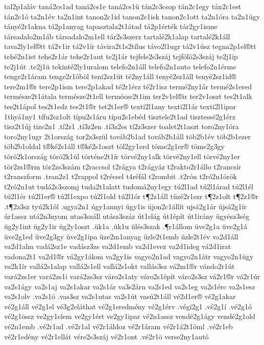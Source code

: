 {tal2p1aláv
taná2cs1ad
taná2cs1e
taná2cs1ü
tán2c3csop
tán2c1egy
tán2c1est
tán2c1ó
ta2n1év
ta2n1int
tanon2c1id
tanon2c1isk
tanon2c1ott
ta2n1óra
ta2n1ügy
tányé2r1akna
tá2p1anyag
tapasztala2t1átad
tá2p1érték
tár2gy1isme
társadalo2m1áb
társadalo2m1ell
tár2s3szerz %
tartalé2k1alap
tartalé2k1áll
tava2ly1el®tt
tá2v1ir
tá2v1ír
távira2t1s2tílus
távo2l1ugr
tá2v1úsz
tegna2p1el®tt
tehé2n1ist
tehe2r1ár
tehe2r1aut
te2j1ár
tejfele2s3száj %
tejfölö2s3száj %
te2j1ip
te2j1út
.te2j1ü
tekinté2ly1uralom
telefo2n1áll
telefo2n1auto
telefo2n1érme
tenge2r1áram
tenge2r1öböl
teni2sz1üt
té2ny1áll
tenyé2sz1áll
tenyé2sz1id®
tere2m1®r
tere2p1ism
tere2p1akad
té2r1érz
té2r1isz
termé2ny1ár
termé2s1ered
természe2t1átala
természe2t1ell
természe2t1im
ter2v1el®ir
ter2v1oszt
tes2t1alk
tes2t1ápol
tes2t1edz
tes2t1®r
tet2t1er®
texti2l1any
texti2l1ár
texti2l1ipar
1thyá1ny1 %
tífu2sz1olt
típu2s1áru
típu2s1ebéd
tisztele2t1ad
tisztessé2g1érz
tisz2t1új
tize2n1
.tí2z1
.tí3z2en
.tí3z2es
tí2z3szer
toalet2t1aszt
toro2ny1óra
toro2ny1ugr
2t1ország %
tor2z3szül
továb2b1ad
továb2b1áll
töb2b1év
töb2b1ezer
töb2b1oldal
t®ké2s1áll
t®ké2s1oszt
töl2gy1erd
töme2g1er®
töme2g3gy
törö2k1ország
törö2k1ül
történe2t1ír
törvé2ny1alk
törvé2ny1ell
törvé2ny1er
tör2zs1®rm
tör2zs3szám
t2raccsol
t2rágya
t2rágyáz
t2rakto2r1állo
t2rancsír
t2ranszform
.tran2z1
t2rappol
t2récsel
t4réfál
t2rombit
.t2rón
t2ró2n1örök
t2ró2n1ut
tudá2s3szomj
tuda2t1alatt
tudomá2ny1egy
tú2l1ad
tú2l1árad
tú2l1él
tú2l1ér
tú2l1er®
tú2l1expo
tú2l1old
tú2l1ór
t¶2z1áll
tüzé2r1ezr
t¶2z1olt
t¶2z1®r
.t¶2z3sz
tyú2k1ól
.ugya2n1
úgy1annyi
úgy1is
újon2c1állít
ujsá2g1ár
újsá2g1ír
úr1assz
utá2n3nyom
utas3száll
utász3száz
út1elág
út1épít
út1irány
ügyész3ség
üg2y1int
üg2y1ir
üg2y1oszt
.ük1a
.ük1u
ülés3szak
.¶r1állom
üve2g1a
üve2g1á
üve2g1ed
üve2g3gy
üve2g1ipa
üze2m1anyag
üzle2t1emb
üzle2t1év
va2d1áll
va2d1alm
vadá2sz1e
vadász3zs
va2d1emb
va2d1evez
va2d1ideg
vá2d1irat
vadona2t1
va2d1®r
vá2gy1álom
va2gy1is
vagyo2n1ad
vagyo2n1átr
vagyo2n1ügy
va2k1ír
vallá2s1alap
vallá2s1ell
vallá2s1okt
vallás3sz
vá2m1®r
vándo2r1út
vará2zs1er
vará2zs1i
vará2zs3sz
váro2s1aty
váro2s1épít
váro2s3sz
vá2r1®r
vá2r1úr
va2s1ágy
va2s1aj
va2s1akar
va2s1ár
va3s2árn
va2s1ed
va2s1eg
va2s1érc
va2s1esz
va2s1olv
.va2s1ö
.vas3sz
va2s1utas
va2s1út
vasú2t1áll
vé2d1er®
vé2g1akar
vé2g1áll
vé2g1el
vé3g2eláthat
vé2g1eredmény
vé2g1érv
.végi2g1
.vé2g1í
.vé2g1ó
vé2g1össz
ve2gy1elem
ve2gy1ért
ve2gy1ipar
vé2n1assz
vendé2g1ágy
vendé2g1old
vé2n1emb
.vé2r1ad
.vé2r1al
vé2r1áldoz
vé2r1áram
vé2r1á2t1öml
.vé2r1eb
vé2r1edény
vé2r1ellát
vére2s3száj
vé2r1ont
.vé2r1ö
verse2ny1autó
}
